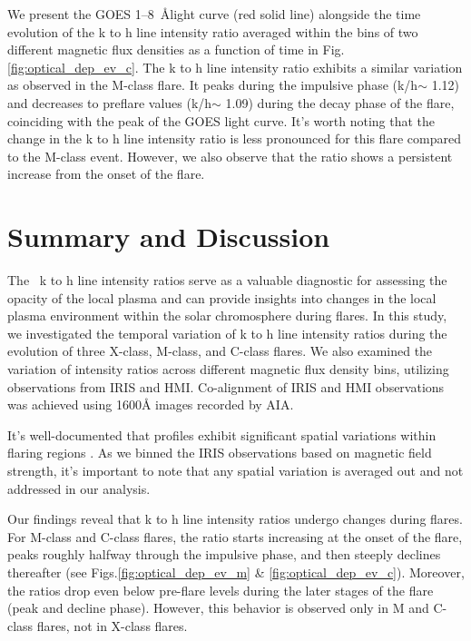 We present the GOES 1{--}8~{\AA}light curve (red solid line) alongside the time evolution of the   k to h line intensity ratio averaged within the bins of two different magnetic flux densities as a function of time in Fig.\ref{fig:optical_dep_ev_c}. The   k to h line intensity ratio exhibits a similar variation as observed in the M-class flare. It peaks during the impulsive phase (k/h$\sim$ 1.12) and decreases to preflare values (k/h$\sim$ 1.09) during the decay phase of the flare, coinciding with the peak of the GOES light curve. It's worth noting that the change in the   k to h line intensity ratio is less pronounced for this flare compared to the M-class event. However, we also observe that the ratio shows a persistent increase from the onset of the flare.

\section{Summary and Discussion}

The  ~k to h line intensity ratios serve as a valuable diagnostic for assessing the opacity of the local plasma and can provide insights into changes in the local plasma environment within the solar chromosphere during flares. In this study, we investigated the temporal variation of  k to h line intensity ratios during the evolution of three X-class, M-class, and C-class flares. We also examined the variation of intensity ratios across different magnetic flux density bins, utilizing observations from IRIS and HMI. Co-alignment of IRIS and HMI observations was achieved using 1600{\AA} images recorded by AIA.

It's well-documented that   profiles exhibit significant spatial variations within flaring regions \citep{dalda23,panos18}. As we binned the IRIS observations based on magnetic field strength, it's important to note that any spatial variation is averaged out and not addressed in our analysis.

Our findings reveal that   k to h line intensity ratios undergo changes during flares. For M-class and C-class flares, the ratio starts increasing at the onset of the flare, peaks roughly halfway through the impulsive phase, and then steeply declines thereafter (see Figs.\ref{fig:optical_dep_ev_m} \& \ref{fig:optical_dep_ev_c}). Moreover, the ratios drop even below pre-flare levels during the later stages of the flare (peak and decline phase). However, this behavior is observed only in M and C-class flares, not in X-class flares.

